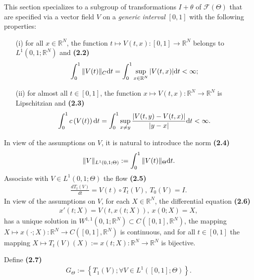 \documentclass{book}
\numberwithin{equation}{section}
\begin{document}
\begin{enumerate}
    This section specializes to a subgroup of transformations $I + \theta$ of $\mathcal{F}(\Theta)$ that are specified via a vector field $V$ on a \textit{generic interval} $[0,1]$ with the following properties:
    \begin{itemize}
        \item[(i)] for all $x\in\mathbb{R}^N$, the function $t\mapsto V(t,x):[0,1]\to\mathbb{R}^N$ belongs to $L^1(0,1;\mathbb{R}^N)$ and \textbf{(2.2)}
        \begin{align*}
            \int_0^1 \|V(t)\|_C{\rm d}t = \int_0^1 \sup_{x\in\mathbb{R}^N} |V(t,x)|{\rm d}t < \infty;
        \end{align*}
        \item[(ii)] for almost all $t\in[0,1]$, the function $x\mapsto V(t,x):\mathbb{R}^N\to\mathbb{R}^N$ is Lipschitzian and \textbf{(2.3)}
        \begin{align*}
            \int_0^1 c\left(V(t)\right){\rm d}t = \int_0^1 \sup_{x\ne y} \frac{\left|V(t,y) - V(t,x)\right|}{|y - x|}{\rm d}t < \infty.
        \end{align*}
    \end{itemize}
    In view of the assumptions on $V$, it is natural to introduce the norm \textbf{(2.4)}
    \begin{align*}
        \|V\|_{L^1(0,1;\Theta)} := \int_0^1 \|V(t)\|_\Theta{\rm d}t.
    \end{align*}
    Associate with $V\in L^1(0,1;\Theta)$ the flow \textbf{(2.5)}
    \begin{align*}
        \frac{dT_t(V)}{dt} = V(t)\circ T_t(V),\ T_0(V) = I.
    \end{align*}
    In view of the assumptions on $V$, for each $X\in\mathbb{R}^N$, the differential equation \textbf{(2.6)}
    \begin{align*}
        x'(t;X) = V\left(t,x(t;X)\right),\ x(0;X) = X,
    \end{align*}
    has a unique solution in $W^{1,1}(0,1;\mathbb{R}^N)\subset C([0,1],\mathbb{R}^N)$, the mapping $X\mapsto x(\cdot;X):\mathbb{R}^N\to C([0,1],\mathbb{R}^N)$ is continuous, and for all $t\in[0,1]$ the mapping $X\mapsto T_t(V)(X) := x(t;X):\mathbb{R}^N\to\mathbb{R}^N$ is bijective.
    
    Define \textbf{(2.7)}
    \begin{align*}
        G_\Theta := \left\{T_1(V);\forall V\in L^1([0,1];\Theta)\right\}.
    \end{align*}
    

\end{enumerate}
\end{document}
